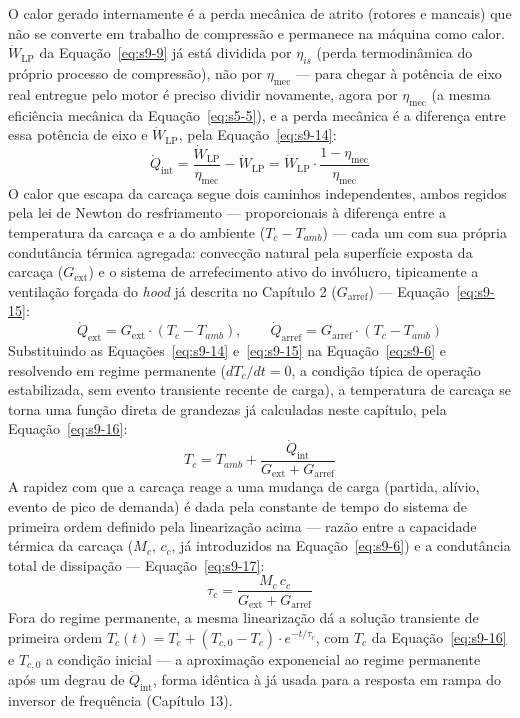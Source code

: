 \documentclass[12pt,a4paper]{article}
\numberwithin{equation}{section}
\numberwithin{table}{section}
\numberwithin{figure}{section}
\begin{document}
	O calor gerado internamente é a perda mecânica de atrito (rotores e mancais) que não se converte em trabalho de compressão e permanece na máquina como calor. $\dot{W}_{\text{LP}}$ da Equação~\eqref{eq:s9-9} já está dividida por $\eta_{is}$ (perda termodinâmica do próprio processo de compressão), não por $\eta_{\text{mec}}$ — para chegar à potência de eixo real entregue pelo motor é preciso dividir novamente, agora por $\eta_{\text{mec}}$ (a mesma eficiência mecânica da Equação~\eqref{eq:s5-5}), e a perda mecânica é a diferença entre essa potência de eixo e $\dot{W}_{\text{LP}}$, pela Equação~\eqref{eq:s9-14}:
	\begin{equation}\label{eq:s9-14}
 \dot{Q}_{\text{int}} = \frac{\dot{W}_{\text{LP}}}{\eta_{\text{mec}}} - \dot{W}_{\text{LP}} = \dot{W}_{\text{LP}} \cdot \frac{1 - \eta_{\text{mec}}}{\eta_{\text{mec}}}
\end{equation}
	O calor que escapa da carcaça segue dois caminhos independentes, ambos regidos pela lei de Newton do resfriamento — proporcionais à diferença entre a temperatura da carcaça e a do ambiente ($T_c - T_{amb}$) — cada um com sua própria condutância térmica agregada: convecção natural pela superfície exposta da carcaça ($G_{\text{ext}}$) e o sistema de arrefecimento ativo do invólucro, tipicamente a ventilação forçada do \textit{hood} já descrita no Capítulo 2 ($G_{\text{arref}}$) — Equação~\eqref{eq:s9-15}:
	\begin{equation}\label{eq:s9-15}
 \dot{Q}_{\text{ext}} = G_{\text{ext}} \cdot (T_c - T_{amb}), \qquad
 \dot{Q}_{\text{arref}} = G_{\text{arref}} \cdot (T_c - T_{amb})
\end{equation}
	Substituindo as Equações~\eqref{eq:s9-14} e~\eqref{eq:s9-15} na Equação~\eqref{eq:s9-6} e resolvendo em regime permanente ($dT_c/dt=0$, a condição típica de operação estabilizada, sem evento transiente recente de carga), a temperatura de carcaça se torna uma função direta de grandezas já calculadas neste capítulo, pela Equação~\eqref{eq:s9-16}:
	\begin{equation}\label{eq:s9-16}
 T_{c} = T_{amb} + \frac{\dot{Q}_{\text{int}}}{G_{\text{ext}} + G_{\text{arref}}}
\end{equation}
	A rapidez com que a carcaça reage a uma mudança de carga (partida, alívio, evento de pico de demanda) é dada pela constante de tempo do sistema de primeira ordem definido pela linearização acima — razão entre a capacidade térmica da carcaça ($M_c$, $c_c$, já introduzidos na Equação~\eqref{eq:s9-6}) e a condutância total de dissipação — Equação~\eqref{eq:s9-17}:
	\begin{equation}\label{eq:s9-17}
 \tau_c = \frac{M_c \, c_c}{G_{\text{ext}} + G_{\text{arref}}}
\end{equation}
	Fora do regime permanente, a mesma linearização dá a solução transiente de primeira ordem $T_c(t) = T_{c} + (T_{c,0} - T_{c}) \cdot e^{-t/\tau_c}$, com $T_c$ da Equação~\eqref{eq:s9-16} e $T_{c,0}$ a condição inicial — a aproximação exponencial ao regime permanente após um degrau de $\dot{Q}_{\text{int}}$, forma idêntica à já usada para a resposta em rampa do inversor de frequência (Capítulo 13).
\end{document}
